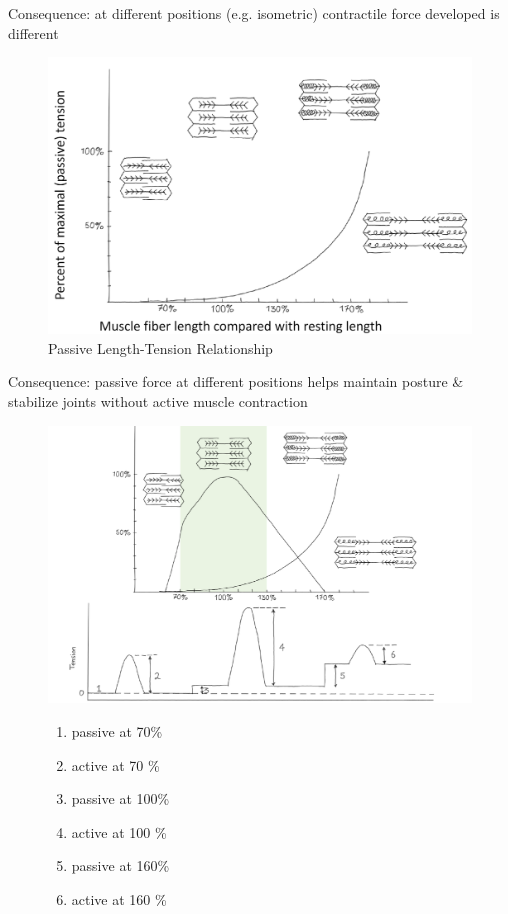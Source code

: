 \documentclass[11pt,fleqn]{book} %
\begin{document}
\begin{remark}
    Consequence: at different
positions (e.g. isometric)
contractile force developed is
different
\end{remark}
\begin{figure}[h!]
\begin{center}
    \includegraphics[width=0.6\linewidth]{Pictures/Screenshot 2024-04-03 230713.png}
    \caption{Passive Length-Tension Relationship}
\end{center}
\end{figure}


\begin{remark}
    Consequence: passive force at
different positions helps maintain
posture \& stabilize joints without
active muscle contraction
\end{remark}
\begin{figure}[h!]
\begin{center}
    \includegraphics[width=0.85\linewidth]{Pictures/Screenshot 2024-04-03 230817.png}
\caption{ }
\begin{enumerate}
        \item passive at 70\%
        \item active at 70 \%
        \item passive at 100\%
        \item active at 100 \%
        \item passive at 160\%
        \item active at 160 \%
    \end{enumerate}
\end{center}
\end{figure}
\end{document}

